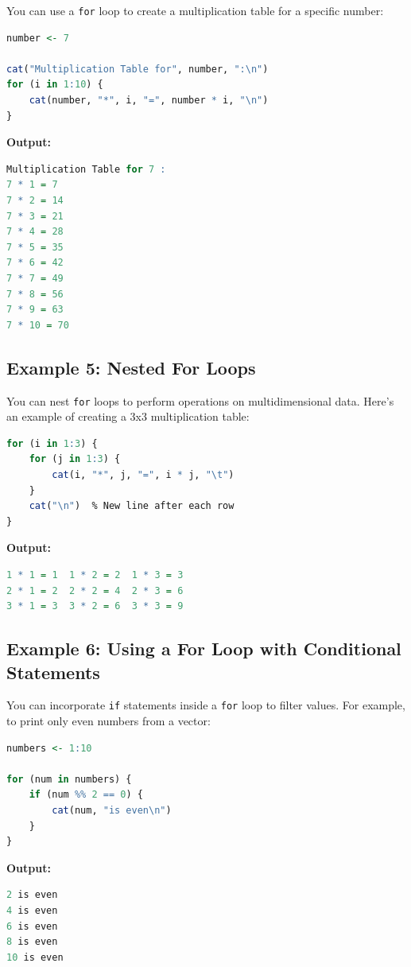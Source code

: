 \documentclass[10pt]{book}
\begin{document}
You can use a \texttt{for} loop to create a multiplication table for a specific number:

\begin{lstlisting}[language=R]
number <- 7

cat("Multiplication Table for", number, ":\n")
for (i in 1:10) {
    cat(number, "*", i, "=", number * i, "\n")
}
\end{lstlisting}

\textbf{Output:}
\begin{lstlisting}[language=R]
Multiplication Table for 7 :
7 * 1 = 7 
7 * 2 = 14 
7 * 3 = 21 
7 * 4 = 28 
7 * 5 = 35 
7 * 6 = 42 
7 * 7 = 49 
7 * 8 = 56 
7 * 9 = 63 
7 * 10 = 70 
\end{lstlisting}

\subsection{Example 5: Nested For Loops}

You can nest \texttt{for} loops to perform operations on multidimensional data. Here’s an example of creating a 3x3 multiplication table:

\begin{lstlisting}[language=R]
for (i in 1:3) {
    for (j in 1:3) {
        cat(i, "*", j, "=", i * j, "\t")
    }
    cat("\n")  % New line after each row
}
\end{lstlisting}

\textbf{Output:}
\begin{lstlisting}[language=R]
1 * 1 = 1  1 * 2 = 2  1 * 3 = 3  
2 * 1 = 2  2 * 2 = 4  2 * 3 = 6  
3 * 1 = 3  3 * 2 = 6  3 * 3 = 9  
\end{lstlisting}

\subsection{Example 6: Using a For Loop with Conditional Statements}

You can incorporate \texttt{if} statements inside a \texttt{for} loop to filter values. For example, to print only even numbers from a vector:

\begin{lstlisting}[language=R]
numbers <- 1:10

for (num in numbers) {
    if (num %% 2 == 0) {
        cat(num, "is even\n")
    }
}
\end{lstlisting}

\textbf{Output:}
\begin{lstlisting}[language=R]
2 is even
4 is even
6 is even
8 is even
10 is even
\end{lstlisting}
\end{document}
